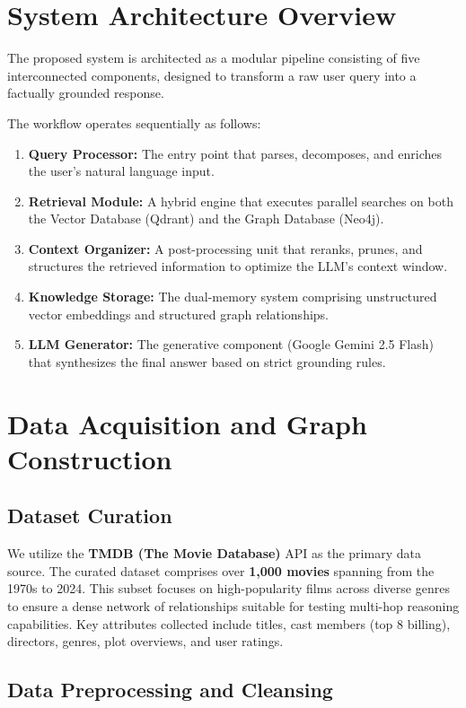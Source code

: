 \documentclass[a4paper, 12pt]{extreport}
\begin{document}
\section{System Architecture Overview}
\label{sec:system_architecture}

The proposed system is architected as a modular pipeline consisting of five interconnected components, designed to transform a raw user query into a factually grounded response.


The workflow operates sequentially as follows:
\begin{enumerate}
    \item \textbf{Query Processor:} The entry point that parses, decomposes, and enriches the user's natural language input.
    \item \textbf{Retrieval Module:} A hybrid engine that executes parallel searches on both the Vector Database (Qdrant) and the Graph Database (Neo4j).
    \item \textbf{Context Organizer:} A post-processing unit that reranks, prunes, and structures the retrieved information to optimize the LLM's context window.
    \item \textbf{Knowledge Storage:} The dual-memory system comprising unstructured vector embeddings and structured graph relationships.
    \item \textbf{LLM Generator:} The generative component (Google Gemini 2.5 Flash) that synthesizes the final answer based on strict grounding rules.
\end{enumerate}


\section{Data Acquisition and Graph Construction}
\label{sec:data_construction}

\subsection{Dataset Curation}
We utilize the \textbf{TMDB (The Movie Database)} API as the primary data source. The curated dataset comprises over \textbf{1,000 movies} spanning from the 1970s to 2024. This subset focuses on high-popularity films across diverse genres to ensure a dense network of relationships suitable for testing multi-hop reasoning capabilities. Key attributes collected include titles, cast members (top 8 billing), directors, genres, plot overviews, and user ratings.
\subsection{Data Preprocessing and Cleansing}
\label{sec:data_preprocessing}
\end{document}
